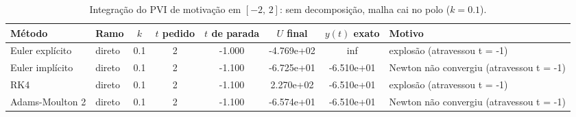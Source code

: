 \begin{table}[H]
    \centering
    \small
    \begin{tabular}{llcccccl}
        \hline
        Método & Ramo & $k$ & $t$ pedido & $t$ de parada & $U$ final & $y(t)$ exato & Motivo \\
        \hline
        Euler explícito & direto & 0.1 & 2 & -1.000 & -4.769e+02 & inf & explosão (atravessou t = -1) \\
        Euler implícito & direto & 0.1 & 2 & -1.100 & -6.725e+01 & -6.510e+01 & Newton não convergiu (atravessou t = -1) \\
        RK4 & direto & 0.1 & 2 & -1.100 & 2.270e+02 & -6.510e+01 & explosão (atravessou t = -1) \\
        Adams-Moulton 2 & direto & 0.1 & 2 & -1.100 & -6.574e+01 & -6.510e+01 & Newton não convergiu (atravessou t = -1) \\
        \hline
    \end{tabular}
    \caption{Integração do PVI de motivação em $[-2,\, 2]$: sem decomposição, malha cai no polo ($k = 0.1$).}
    \label{tab:m2_2_sem_decomp_cai_polo}
\end{table}
